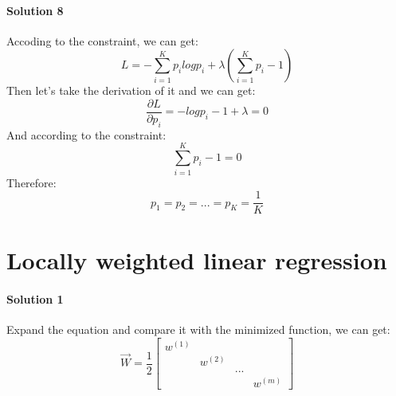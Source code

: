\documentclass[paper=a4, fontsize=11pt]{scrartcl} %
\numberwithin{equation}{section} %
\numberwithin{figure}{section} %
\numberwithin{table}{section} %
\begin{document}
\paragraph{\textbf{Solution 8}}
Accoding to the constraint, we can get:
\begin{equation*}
L=-\sum_{i=1}^{K}p_{i}logp_{i}+\lambda \left ( \sum_{i=1}^{K}p_{i}-1 \right )
\end{equation*}
Then let's take the derivation of it and we can get:
\begin{equation*}
\frac{\partial L}{\partial p_{i}}=-logp_{i}-1+\lambda =0
\end{equation*}
And according to the constraint:
\begin{equation*}
\sum_{i=1}^{K}p_{i}-1=0
\end{equation*}
Therefore:
\begin{equation*}
p_{1}=p_{2}=...=p_{K}=\frac{1}{K}
\end{equation*}

\section{Locally weighted linear regression}
\paragraph{\textbf{Solution 1}}
Expand the equation and compare it with the minimized function, we can get:
\begin{equation*}
\vec{W}=\frac{1}{2}\begin{bmatrix}
w^{\left ( 1 \right )} &  &  & \\
 & w^{\left ( 2 \right )} &  & \\
 &  & ... & \\
 &  &  & w^{\left ( m \right )}
\end{bmatrix}
\end{equation*}
\end{document}
